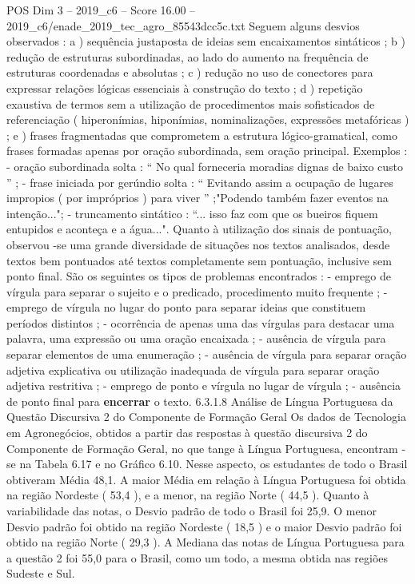 \begin{textsample}{POS Dim 3 – 2019\_c6 – Score 16.00 – 2019\_c6/enade\_2019\_tec\_agro\_85543dcc5c.txt}
Seguem alguns desvios observados : a ) sequência justaposta de ideias sem encaixamentos sintáticos ; b ) redução de estruturas subordinadas, ao lado do aumento na frequência de estruturas coordenadas e absolutas ; c ) redução no uso de conectores para expressar relações lógicas essenciais à construção do texto ; d ) repetição exaustiva de termos sem a utilização de procedimentos mais sofisticados de referenciação ( hiperonímias, hiponímias, nominalizações, expressões metafóricas ) ; e ) frases fragmentadas que comprometem a estrutura lógico-gramatical, como frases formadas apenas por oração subordinada, sem oração principal.
Exemplos : - oração subordinada solta : “ No qual forneceria moradias dignas de baixo custo ” ; - frase iniciada por gerúndio solta : “ Evitando assim a ocupação de lugares impropios ( por impróprios ) para viver ” ;"Podendo também fazer eventos na intenção..."; - truncamento sintático : “... isso faz com que os bueiros fiquem entupidos e aconteça e a água...".
Quanto à utilização dos sinais de pontuação, observou -se uma grande diversidade de situações nos textos analisados, desde textos bem pontuados até textos completamente sem pontuação, inclusive sem ponto final.
São os seguintes os tipos de problemas encontrados : - emprego de vírgula para separar o sujeito e o predicado, procedimento muito frequente ; - emprego de vírgula no lugar do ponto para separar ideias que constituem períodos distintos ; - ocorrência de apenas uma das vírgulas para destacar uma palavra, uma expressão ou uma oração encaixada ; - ausência de vírgula para separar elementos de uma enumeração ; - ausência de vírgula para separar oração adjetiva explicativa ou utilização inadequada de vírgula para separar oração adjetiva restritiva ; - emprego de ponto e vírgula no lugar de vírgula ; - ausência de ponto final para \textbf{encerrar} o texto. 6.3.1.8 Análise de Língua Portuguesa da Questão Discursiva 2 do Componente de Formação Geral Os dados de Tecnologia em Agronegócios, obtidos a partir das respostas à questão discursiva 2 do Componente de Formação Geral, no que tange à Língua Portuguesa, encontram -se na Tabela 6.17 e no Gráfico 6.10.
Nesse aspecto, os estudantes de todo o Brasil obtiveram Média 48,1.
A maior Média em relação à Língua Portuguesa foi obtida na região Nordeste ( 53,4 ), e a menor, na região Norte ( 44,5 ).
Quanto à variabilidade das notas, o Desvio padrão de todo o Brasil foi 25,9.
O menor Desvio padrão foi obtido na região Nordeste ( 18,5 ) e o maior Desvio padrão foi obtido na região Norte ( 29,3 ).
A Mediana das notas de Língua Portuguesa para a questão 2 foi 55,0 para o Brasil, como um todo, a mesma obtida nas regiões Sudeste e Sul.

\end{textsample}
